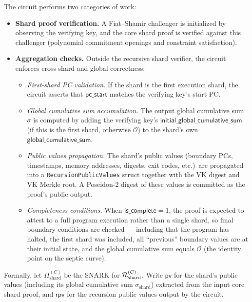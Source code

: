 \documentclass[11pt]{article}
\begin{document}
The circuit performs two categories of work:
\begin{itemize}
\item \textbf{Shard proof verification.}
A Fiat--Shamir challenger is initialized by observing the verifying key,
and the core shard proof is verified against this challenger
(polynomial commitment openings and constraint satisfaction).

\item \textbf{Aggregation checks.}
Outside the recursive shard verifier, the circuit enforces cross-shard and global correctness:
\begin{itemize}
\item \emph{First-shard PC validation.}
If the shard is the first execution shard,
the circuit asserts that $\mathsf{pc\_start}$ matches the verifying key's start PC.

\item \emph{Global cumulative sum accumulation.}
The output global cumulative sum $\sigma$ is computed by adding
the verifying key's $\mathsf{initial\_global\_cumulative\_sum}$ (if this is the first shard,
otherwise $\mathcal{O}$) to the shard's own $\mathsf{global\_cumulative\_sum}$.

\item \emph{Public values propagation.}
The shard's public values (boundary PCs, timestamps, memory addresses,
digests, exit codes, etc.)\ are propagated into a \texttt{RecursionPublicValues} struct
together with the VK digest and VK Merkle root.
A Poseidon-2 digest of these values is committed as the proof's public output.

\item \emph{Completeness conditions.}
When $\mathsf{is\_complete}=1$, the proof is expected to attest to a
full program execution rather than a single shard, so final boundary
conditions are checked --- including that the program has halted,
the first shard was included,
all ``previous'' boundary values are at their initial state,
and the global cumulative sum equals $\mathcal{O}$
(the identity point on the septic curve).
\end{itemize}
\end{itemize}

Formally, let $\Pi_{\mathrm{shard}}^{(C)}$ be the SNARK for
$\mathcal{R}_{\mathrm{shard}}^{(C)}$.
Write $\mathsf{pv}$ for the shard's public values
(including its global cumulative sum $\sigma_{\mathrm{shard}}$)
extracted from the input core shard proof,
and $\mathsf{rpv}$ for the recursion public values output by the circuit.
\end{document}
